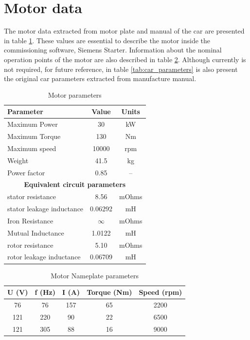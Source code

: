 \section{Motor data}

The motor data extracted from motor plate and manual of the car are presented in table \ref{tab:motor_parameters}. These values are essential to describe the motor inside the commissioning software, Siemens Starter. Information about the nominal operation points of the motor are also described in table \ref{tab:motor_nameplate_data}. Although currently is not required, for future reference, in table \ref{tab:car_parameters} is also present the original car parameters extracted from manufacture manual.
 

\begin{table}
	\centering
	\begin{tabular}{lcc}
		\toprule
		\textbf{Parameter} & \textbf{Value} & \textbf{Units}\\
		\midrule
		Maximum Power & 30 & kW\\  
		Maximum Torque & 130 & Nm \\
		Maximum speed & 10000 & rpm \\
		Weight & 41.5 & kg \\
		Power factor & 0.85 & --\\
		\midrule
		\multicolumn{3}{c}{\textbf{Equivalent circuit parameters}}\\
		\midrule
		stator resistance & 8.56 & mOhms \\
		stator leakage inductance & 0.06292 & mH \\
		Iron Resistance & $\infty$ & mOhms\\
		Mutual Inductance & 1.0122 & mH \\
		rotor resistance & 5.10 & mOhms \\
		rotor leakage inductance & 0.06709 & mH \\
		\bottomrule
	\end{tabular}
	\caption{Motor parameters}
	\label{tab:motor_parameters}
\end{table}

\begin{table}
	\centering
	\begin{tabular}{ccccc}
		\toprule
		\textbf{U (V)} & \textbf{f (Hz)} & \textbf{I (A)} & \textbf{Torque (Nm)} & \textbf{Speed (rpm)} \\
		\midrule
		76 & 76 & 157 & 65 & 2200 \\
		121 & 220 & 90 & 22 & 6500 \\
		121 & 305 & 88 & 16 & 9000 \\
		\bottomrule
	\end{tabular}
	\caption{Motor Nameplate parameters}
\label{tab:motor_nameplate_data}
\end{table}



